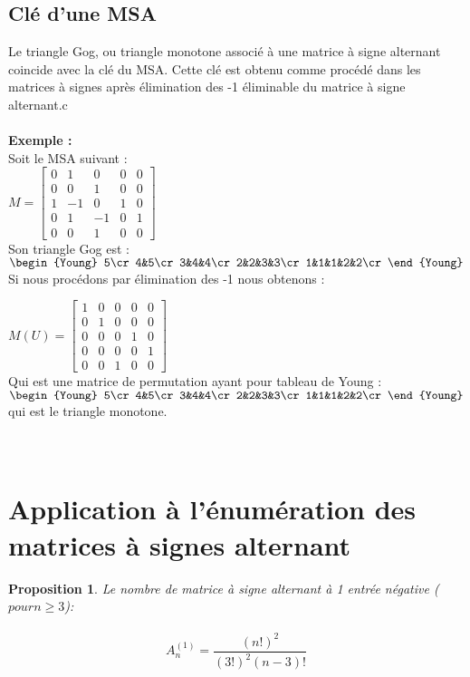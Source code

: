 \documentclass{book}
\newtheorem{petit_nom1}{Proposition}
\begin{document}
\subsection{Clé d'une MSA}
Le triangle Gog, ou triangle monotone associé à une matrice à signe alternant coincide avec la clé du MSA. Cette clé est obtenu comme procédé dans les matrices à signes après élimination des -1 éliminable du matrice à signe alternant.c \\ \\
\textbf{Exemple :}\\
Soit le MSA suivant :\\
$M=\begin{bmatrix}
0&1&0&0&0\\0&0&1&0&0\\1&-1&0&1&0\\0&1&-1&0&1\\0&0&1&0&0
\end{bmatrix}$ \\

Son triangle Gog est : 
$\begin{Young}
5\cr
4&5\cr
3&4&4\cr
2&2&3&3\cr
1&1&1&2&2\cr
\end{Young}  $ \\

Si nous procédons par élimination des -1 nous obtenons :

$M(U)=\begin{bmatrix}
1&0&0&0&0\\0&1&0&0&0\\0&0&0&1&0\\0&0&0&0&1\\0&0&1&0&0
\end{bmatrix}$\\
Qui est une matrice de permutation ayant pour tableau de Young : \\
$\begin{Young}
5\cr
4&5\cr
3&4&4\cr
2&2&3&3\cr
1&1&1&2&2\cr
\end{Young}  $\\
qui est le triangle monotone.\\\\\\

\section{Application à l'énumération des matrices à signes alternant}
\begin{petit_nom1}
Le nombre de matrice à signe alternant à 1 entrée négative ($pour n \geq 3$): \\\\
\begin{equation}
A_n^{(1)}=\frac{(n!)^2}{(3!)^2(n-3)!}
\end{equation}
\end{petit_nom1}\\
\end{document}
